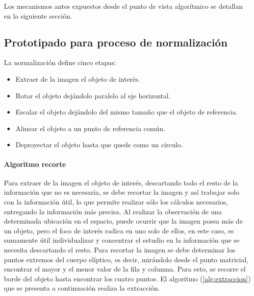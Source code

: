Los mecanismos antes expuestos desde el punto de vista algorítmico se
detallan en la siguiente sección.



\subsection{Prototipado para proceso de normalización}

La normalización define cinco etapas:

\begin{itemize}
  \item Extraer de la imagen el objeto de interés.
  \item Rotar el objeto dejándolo paralelo al eje horizontal.
  \item Escalar el objeto dejándolo del mismo tamaño que el objeto de
    referencia.
  \item Alinear el objeto a un punto de referencia común.
  \item Deproyectar el objeto hasta que quede como un círculo.
\end{itemize}

\paragraph{Algoritmo recorte}

Para extraer de la imagen el objeto de interés, descartando todo el
resto de la información que no es necesaria, se debe recortar la
imagen y así trabajar solo con la información útil, lo que permite
realizar sólo los cálculos necesarios, entregando la información más
precisa. Al realizar la observación de una determinada ubicación en el
espacio, puede ocurrir que la imagen posea más de un objeto, pero el
foco de interés radica en uno solo de ellos, en este caso, es
sumamente útil individualizar y concentrar el estudio en la
información que se necesita descartando el resto. Para recortar la
imagen se debe determinar los puntos extremos del cuerpo elíptico, es
decir, mirándolo desde el punto matricial, encontrar el mayor y el
menor valor de la fila y columna. Para esto, se recorre el borde del
objeto hasta encontrar los cuatro puntos. El algoritmo
(\ref{alg:extraccion}) que se presenta a continuación realiza la
extracción.

